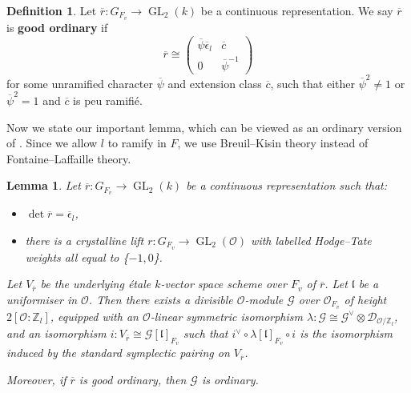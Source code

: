 \documentclass[10pt]{article}
\newtheorem{lemma}[theorem]{Lemma}
\theoremstyle{definition}
\newtheorem{defn}[theorem]{Definition}
\numberwithin{equation}{theorem}
\newcommand{\ZZ}{\mathbb{Z}}
\newcommand{\calD}{\mathcal{D}}
\newcommand{\calG}{\mathcal{G}}
\newcommand{\calO}{\mathcal{O}}
\newcommand{\gothl}{\mathfrak{l}}
\DeclareMathOperator{\GL}{GL}
\begin{document}
\begin{defn}\label{GoodOrdinary}
Let $\overline{r}:G_{F_v}\to\GL_2(k)$ be a continuous representation. We say $\overline{r}$ is \textbf{good ordinary} if $$\overline{r}\cong\left(\begin{array}{cc}
    \overline{\psi}\overline{\epsilon}_l & \overline{c} \\
    0 & \overline{\psi}^{-1}
\end{array}\right)$$ for some unramified character $\overline{\psi}$ and extension class $\overline{c}$, such that either $\overline{\psi}^2\ne1$ or $\overline{\psi}^2=1$ and $\overline{c}$ is peu ramifi\'e.
\end{defn}

Now we state our important lemma, which can be viewed as an ordinary version of \cite[Lemma~3.8]{AN19}. Since we allow $l$ to ramify in $F$, we use Breuil--Kisin theory instead of Fontaine--Laffaille theory.

\begin{lemma}\label{g3.8}
Let $\overline{r}:G_{F_v}\to\GL_2(k)$ be a continuous representation such that:
\begin{itemize}
    \item $\det\overline{r}=\overline{\epsilon}_l$,
    \item there is a crystalline lift $r:G_{F_v}\to\GL_2(\calO)$ with labelled Hodge--Tate weights all equal to \{$-1,0$\}.
\end{itemize}
Let $V_{\overline{r}}$ be the underlying \'etale $k$-vector space scheme over $F_v$ of $\overline{r}$. Let $\gothl$ be a uniformiser in $\calO$. Then there exists a divisible $\calO$-module $\calG$ over $\calO_{F_v}$ of height $2[\calO:\ZZ_l]$, equipped with an $\calO$-linear symmetric isomorphism $\lambda:\calG\cong\calG^\vee\otimes\calD_{\calO/\ZZ_l}$, and an isomorphism $i:V_{\overline{r}}\cong\calG[\gothl]_{F_v}$ such that $i^\vee\circ\lambda[\gothl]_{F_v}\circ i$ is the isomorphism induced by the standard symplectic pairing on $V_{\overline{r}}$.

Moreover, if $\overline{r}$ is good ordinary, then $\calG$ is ordinary.
\end{lemma}
\end{document}
